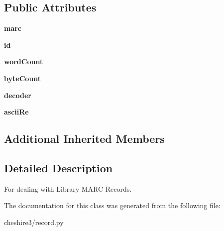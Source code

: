 \subsection*{Public Attributes}
\begin{DoxyCompactItemize}
\item 
\hypertarget{classcheshire3_1_1record_1_1_marc_record_a7f2e7c19d9dc12cc0bb3de01da9935d6}{{\bfseries marc}}\label{classcheshire3_1_1record_1_1_marc_record_a7f2e7c19d9dc12cc0bb3de01da9935d6}

\item 
\hypertarget{classcheshire3_1_1record_1_1_marc_record_ac0212cd21d5034af8f8aca7fc97c0308}{{\bfseries id}}\label{classcheshire3_1_1record_1_1_marc_record_ac0212cd21d5034af8f8aca7fc97c0308}

\item 
\hypertarget{classcheshire3_1_1record_1_1_marc_record_aaef568f75c7883a9711c22dab393196c}{{\bfseries word\-Count}}\label{classcheshire3_1_1record_1_1_marc_record_aaef568f75c7883a9711c22dab393196c}

\item 
\hypertarget{classcheshire3_1_1record_1_1_marc_record_abd71af72f201902c4e3a962e1c43237d}{{\bfseries byte\-Count}}\label{classcheshire3_1_1record_1_1_marc_record_abd71af72f201902c4e3a962e1c43237d}

\item 
\hypertarget{classcheshire3_1_1record_1_1_marc_record_a28594247bfa90e46b892466dec99fadc}{{\bfseries decoder}}\label{classcheshire3_1_1record_1_1_marc_record_a28594247bfa90e46b892466dec99fadc}

\item 
\hypertarget{classcheshire3_1_1record_1_1_marc_record_a0a4ba381dd71c578a15216c3d8d2bcbc}{{\bfseries ascii\-Re}}\label{classcheshire3_1_1record_1_1_marc_record_a0a4ba381dd71c578a15216c3d8d2bcbc}

\end{DoxyCompactItemize}
\subsection*{Additional Inherited Members}


\subsection{Detailed Description}
\begin{DoxyVerb}For dealing with Library MARC Records.\end{DoxyVerb}
 

The documentation for this class was generated from the following file\-:\begin{DoxyCompactItemize}
\item 
cheshire3/record.\-py\end{DoxyCompactItemize}
